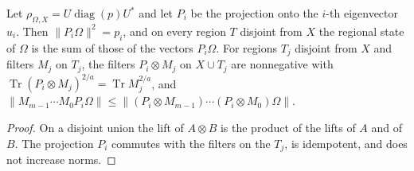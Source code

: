 \begin{lemma}
    \label{lem:trial_filters}
    \leanok
    Let $\rho_{\Omega,X}=U\operatorname{diag}(p)U^*$ and let $P_i$ be the projection onto the
    $i$-th eigenvector $u_i$. Then $\lVert P_i\Omega\rVert^2=p_i$, and on every region $T$
    disjoint from $X$ the regional state of $\Omega$ is the sum of those of the vectors
    $P_i\Omega$. For regions $T_j$ disjoint from $X$ and filters $M_j$ on $T_j$, the filters
    $P_i\otimes M_j$ on $X\cup T_j$ are nonnegative with $\operatorname{Tr}(P_i\otimes
        M_j)^{2/a}=\operatorname{Tr}M_j^{2/a}$, and
    $\lVert M_{m-1}\cdots M_0P_i\Omega\rVert\le\lVert(P_i\otimes M_{m-1})\cdots
        (P_i\otimes M_0)\Omega\rVert$.
\end{lemma}
\begin{proof}\leanok
    On a disjoint union the lift of $A\otimes B$ is the product of the lifts of $A$ and of $B$.
    The projection $P_i$ commutes with the filters on the $T_j$, is idempotent, and does not
    increase norms.
\end{proof}

